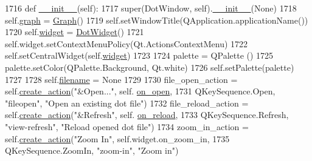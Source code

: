 \begin{DoxyCode}
1716     \textcolor{keyword}{def }\hyperlink{classsmacc__viewer_1_1xdot_1_1xdot__qt_1_1DotWindow_ae12877713195badacce5a0cb3feb299c}{\_\_init\_\_}(self):
1717         super(DotWindow,  self).\hyperlink{classsmacc__viewer_1_1xdot_1_1xdot__qt_1_1DotWindow_ae12877713195badacce5a0cb3feb299c}{\_\_init\_\_}(\textcolor{keywordtype}{None})
1718         self.\hyperlink{classsmacc__viewer_1_1xdot_1_1xdot__qt_1_1DotWindow_adbc10dcc7b25ae1558c43b84308181bd}{graph} = \hyperlink{classsmacc__viewer_1_1xdot_1_1xdot__qt_1_1Graph}{Graph}()
1719         self.setWindowTitle(QApplication.applicationName())
1720         self.\hyperlink{classsmacc__viewer_1_1xdot_1_1xdot__qt_1_1DotWindow_a3a941e7b121c8ce6478a4591e0f9f263}{widget} = \hyperlink{classsmacc__viewer_1_1xdot_1_1xdot__qt_1_1DotWidget}{DotWidget}()
1721         self.widget.setContextMenuPolicy(Qt.ActionsContextMenu)
1722         self.setCentralWidget(self.\hyperlink{classsmacc__viewer_1_1xdot_1_1xdot__qt_1_1DotWindow_a3a941e7b121c8ce6478a4591e0f9f263}{widget})
1723 
1724         palette = QPalette ()
1725         palette.setColor(QPalette.Background, Qt.white)
1726         self.setPalette(palette)
1727 
1728         self.\hyperlink{classsmacc__viewer_1_1xdot_1_1xdot__qt_1_1DotWindow_a8be84c72284dbb6ae2d6e65a03617b23}{filename} = \textcolor{keywordtype}{None}
1729 
1730         file\_open\_action = self.\hyperlink{classsmacc__viewer_1_1xdot_1_1xdot__qt_1_1DotWindow_ae443e00705b869417f630254683e5526}{create\_action}(\textcolor{stringliteral}{"&Open..."}, self.
      \hyperlink{classsmacc__viewer_1_1xdot_1_1xdot__qt_1_1DotWindow_a94129f5cd64f5b95f9a4127c454fad00}{on\_open},
1731                 QKeySequence.Open, \textcolor{stringliteral}{"fileopen"}, \textcolor{stringliteral}{"Open an existing dot file"})
1732         file\_reload\_action = self.\hyperlink{classsmacc__viewer_1_1xdot_1_1xdot__qt_1_1DotWindow_ae443e00705b869417f630254683e5526}{create\_action}(\textcolor{stringliteral}{"&Refresh"}, self.
      \hyperlink{classsmacc__viewer_1_1xdot_1_1xdot__qt_1_1DotWindow_aa01b2325040890c37c11027c0ffe6135}{on\_reload},
1733                 QKeySequence.Refresh, \textcolor{stringliteral}{"view-refresh"}, \textcolor{stringliteral}{"Reload opened dot file"})
1734         zoom\_in\_action = self.\hyperlink{classsmacc__viewer_1_1xdot_1_1xdot__qt_1_1DotWindow_ae443e00705b869417f630254683e5526}{create\_action}(\textcolor{stringliteral}{"Zoom In"}, self.widget.on\_zoom\_in,
1735                 QKeySequence.ZoomIn, \textcolor{stringliteral}{"zoom-in"}, \textcolor{stringliteral}{"Zoom in"})

\end{DoxyCode}
